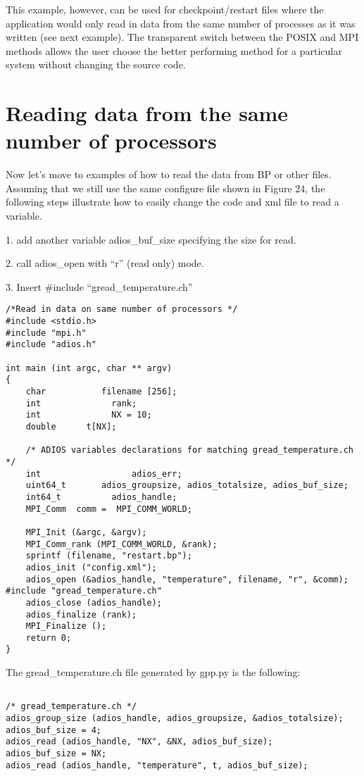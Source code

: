 This example, however, can be used for checkpoint/restart files where the application 
would only read in data from the same number of processes as it was written (see 
next example). The transparent switch between the POSIX and MPI methods allows 
the user choose the better performing method for a particular system without changing 
the source code. 

\section{Reading data from the same number of processors}

Now let's move to examples of how to read the data from BP or other files.  Assuming 
that we still use the same configure file shown in Figure 24, the following steps 
illustrate how to easily change the code and xml file to read a variable. 

1. add another variable adios\_buf\_size specifying the size for read.

2. call adios\_open with ``r'' (read only) mode.

3. Insert \#include ``gread\_temperature.ch''

\begin{lstlisting}[alsolanguage=C,caption=Example of a generated gread\_temperature.ch 
file examples/C/manual/3\_adios\_read.c]
/*Read in data on same number of processors */
#include <stdio.h>
#include "mpi.h"
#include "adios.h"

int main (int argc, char ** argv) 
{
    char           filename [256];
    int              rank;
    int              NX = 10;
    double      t[NX];

    /* ADIOS variables declarations for matching gread_temperature.ch */
    int                  adios_err;
    uint64_t       adios_groupsize, adios_totalsize, adios_buf_size;
    int64_t          adios_handle;
    MPI_Comm  comm =  MPI_COMM_WORLD;

    MPI_Init (&argc, &argv);
    MPI_Comm_rank (MPI_COMM_WORLD, &rank);
    sprintf (filename, "restart.bp");
    adios_init ("config.xml");
    adios_open (&adios_handle, "temperature", filename, "r", &comm);
#include "gread_temperature.ch"
    adios_close (adios_handle);
    adios_finalize (rank);
    MPI_Finalize ();
    return 0;
}
\end{lstlisting}

The gread\_temperature.ch file generated by gpp.py is the following:

\begin{lstlisting}[caption=Example of a generated gread\_temperature.ch 
file]

/* gread_temperature.ch */
adios_group_size (adios_handle, adios_groupsize, &adios_totalsize);
adios_buf_size = 4;
adios_read (adios_handle, "NX", &NX, adios_buf_size);
adios_buf_size = NX;
adios_read (adios_handle, "temperature", t, adios_buf_size);
\end{lstlisting}


